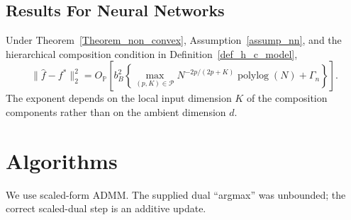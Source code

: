 \documentclass[twoside,11pt]{article}
\newenvironment{revision}{\color{revisionred}}{}
\begin{document}
\subsection{Results For Neural Networks}
\begin{theorem}\label{Theorem_nn_rate}
\begin{revision}
Under Theorem~\ref{Theorem_non_convex}, Assumption~\ref{assump_nn}, and the hierarchical composition condition in Definition~\ref{def_h_c_model},
\begin{equation}
 \|\widehat f-f^*\|_2^2
 =O_{\mathbb P}\left[
 b_B^2\left\{
 \max_{(p,K)\in\mathcal P}N^{-2p/(2p+K)}\operatorname{polylog}(N)
 +\Gamma_n\right\}\right].                                  \label{nn_rate}
\end{equation}
The exponent depends on the local input dimension $K$ of the composition components rather than on the ambient dimension $d$.
\end{revision}
\end{theorem}



\section{Algorithms}

\begin{revision}
We use scaled-form ADMM. The supplied dual ``argmax'' was unbounded; the correct scaled-dual step is an additive update.
\end{revision}
\end{document}
